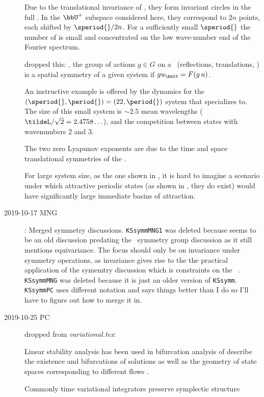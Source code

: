 \begin{description}
Due to the translational invariance of {\KSe},
they form invariant circles
in the full \statesp.
In the $\bbU^+$ subspace considered here,
they correspond to $2n$ points, each shifted by $\speriod{}/2n$.
For a sufficiently small $\speriod{}$
the number of {\eqva} is small and
concentrated on the low wave-number end of the Fourier spectrum.

dropped this: \Group, the group of actions $ g \in G $
    on a \statesp\ (reflections, translations, \etc) is a spatial symmetry of
    a given system if $g u_\zeit = F(g\,u)$.

An instructive example is offered by the dynamics for
the  $(\speriod{},\period{})=(22,\period{})$  system
that  specializes to.
The size of this
small system is $\sim 2.5$ mean wavelengths
($\tildeL/\sqrt{2}= 2.4758\ldots$),
and the competition between states with wavenumbers 2 and 3.

The two zero Lyapunov exponents are due to the time and
space translational symmetries of the \KSe.

For large system size, as the one shown in , it is
hard to imagine a scenario under which attractive periodic states (as
shown in , they do exist) would have significantly large
immediate basins of attraction.

\item[2019-10-17 MNG]: Merged symmetry discussions.
\texttt{KSsymmMNG1} was deleted because seems to be an old discussion predating
the \spt\ symmetry group discussion as it still mentions
equivariance. The focus should only be on invariance under symmetry operations,
as invariance gives rise to the the practical application
of the symemtry discussion which is constraints on the \spt\
\Fcs.
\texttt{KSsymmMNG} was deleted because it is just an older version
of \texttt{KSsymm}.
\texttt{KSsymmPC} uses different notation and says things better than I do
so I'll have to figure out how to merge it in.

\item[2019-10-25 PC]  dropped from \emph{variational.tex}:

Linear stability analysis has been used in bifurcation
analysis of describe the existence and bifurcations of solutions
as well as the geometry of state spaces corresponding to different
flows \refrefs{GHCW07,lanCvit07,W97}.

Commonly time variational integrators preserve symplectic structure


\end{description}

